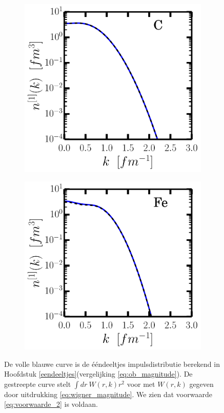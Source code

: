 \documentclass[11pt,twoside]{book}
\begin{document}
\begin{figure}
\centering
 \begin{subfigure}[b]{0.49\textwidth} 
 	\includegraphics[width=\textwidth]{./figuren/C_ob_test.pdf}  
 \end{subfigure} 
 \begin{subfigure}[b]{0.49\textwidth} 
 	\includegraphics[width=\textwidth]{./figuren/Fe_ob_test.pdf}  
 \end{subfigure} 
 \caption{De volle blauwe curve is de \'{e}\'{e}ndeeltjes impulsdistributie berekend in Hoofdstuk \ref{eendeeltjes}(vergelijking \eqref{eq:ob_magnitude}). De gestreepte curve stelt $\int dr\ W(r,k)r^2$ voor met $W(r,k)$ gegeven door uitdrukking \eqref{eq:wigner_magnitude}. We zien dat voorwaarde \eqref{eq:voorwaarde_2} is voldaan. }
   \label{fig:test_ob}
\end{figure}
\end{document}
